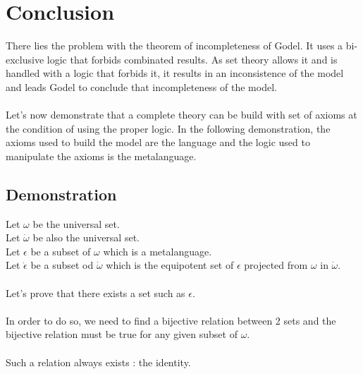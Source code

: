 \documentclass{article}
\begin{document}
  \section{Conclusion}
  There lies the problem with the theorem of incompleteness of Godel. It uses a bi-exclusive logic that forbids combinated results. As set theory allows it and is handled with a logic that forbids it, it results in an inconsistence of the model and leads Godel to conclude that incompleteness of the model.
  ~\\
  ~\\
  Let's now demonstrate that a complete theory can be build with set of axioms at the condition of using the proper logic. In the following demonstration, the axioms used to build the model are the language and the logic used to manipulate the axioms is the metalanguage.
  \subsection{Demonstration}
  Let $\omega$ be the universal set.
  ~\\
  Let $\dot{\omega}$ be also the universal set.
  ~\\
  Let $\epsilon$ be a subset of $\omega$ which is a metalanguage.
  ~\\
  Let $\dot{\epsilon}$ be a subset od $\dot{\omega}$ which is the equipotent set of $\epsilon$ projected from $\omega$ in $\dot{\omega}$.
  ~\\
  ~\\
  Let's prove that there exists a set such as $\epsilon$.
  ~\\
  ~\\
  In order to do so, we need to find a bijective relation between 2 sets and the bijective relation must be true for any given subset of $\omega$.
  ~\\
  ~\\
  Such a relation always exists : the identity.
\end{document}
